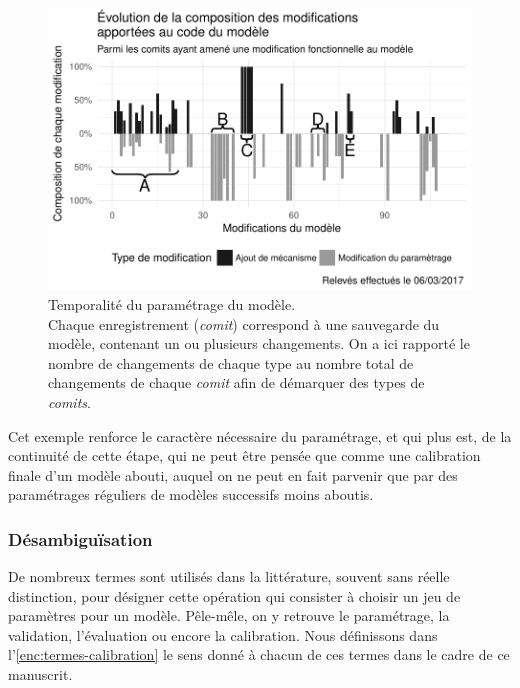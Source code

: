\documentclass[12pt, a4paper, oneside]{book}
\begin{document}
\begin{figure}[!h]
	\includegraphics[width = \linewidth]{img/plotComits.pdf}
	\caption{Temporalité du paramétrage du modèle.\\
	Chaque \og enregistrement\fg{} (\textit{comit}) correspond à une sauvegarde du modèle, contenant un ou plusieurs changements. On a ici rapporté le nombre de changements de chaque type au nombre total de changements de chaque \textit{comit} afin de démarquer des types de \textit{comits}.}
	\label{fig:comits-periodes}
\end{figure}

Cet exemple renforce le caractère nécessaire du paramétrage, et qui plus est, de la continuité de cette étape, qui ne peut être pensée que comme une calibration finale d'un modèle abouti, auquel on ne peut en fait parvenir que par des paramétrages réguliers de modèles successifs moins aboutis.

\subsubsection{Désambiguïsation}

De nombreux termes sont utilisés dans la littérature, souvent sans réelle distinction, pour désigner cette opération qui consister à choisir un jeu de paramètres pour un modèle. Pêle-mêle, on y retrouve le paramétrage, la validation, l'évaluation ou encore la calibration. Nous définissons dans l'\cref{enc:termes-calibration} le sens donné à chacun de ces termes dans le cadre de ce manuscrit.
\end{document}
